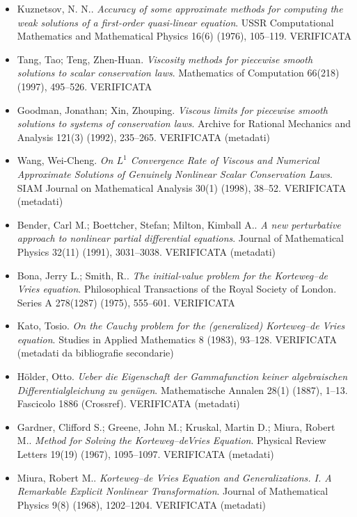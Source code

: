 \begin{itemize}[itemsep=2pt,leftmargin=1.2em,font=\small]
\item Kuznetsov, N. N.. \emph{Accuracy of some approximate methods for computing the weak solutions of a first-order quasi-linear equation}. USSR Computational Mathematics and Mathematical Physics 16(6) (1976), 105--119. \textsf{\footnotesize VERIFICATA}
\item Tang, Tao; Teng, Zhen-Huan. \emph{Viscosity methods for piecewise smooth solutions to scalar conservation laws}. Mathematics of Computation 66(218) (1997), 495--526. \textsf{\footnotesize VERIFICATA}
\item Goodman, Jonathan; Xin, Zhouping. \emph{Viscous limits for piecewise smooth solutions to systems of conservation laws}. Archive for Rational Mechanics and Analysis 121(3) (1992), 235--265. \textsf{\footnotesize VERIFICATA (metadati)}
\item Wang, Wei-Cheng. \emph{On {$L^1$} Convergence Rate of Viscous and Numerical Approximate Solutions of Genuinely Nonlinear Scalar Conservation Laws}. SIAM Journal on Mathematical Analysis 30(1) (1998), 38--52. \textsf{\footnotesize VERIFICATA (metadati)}
\item Bender, Carl M.; Boettcher, Stefan; Milton, Kimball A.. \emph{A new perturbative approach to nonlinear partial differential equations}. Journal of Mathematical Physics 32(11) (1991), 3031--3038. \textsf{\footnotesize VERIFICATA (metadati)}
\item Bona, Jerry L.; Smith, R.. \emph{The initial-value problem for the {K}orteweg--de {V}ries equation}. Philosophical Transactions of the Royal Society of London. Series A 278(1287) (1975), 555--601. \textsf{\footnotesize VERIFICATA}
\item Kato, Tosio. \emph{On the {C}auchy problem for the (generalized) {K}orteweg--de {V}ries equation}. Studies in Applied Mathematics 8 (1983), 93--128. \textsf{\footnotesize VERIFICATA (metadati da bibliografie secondarie)}
\item H{\"o}lder, Otto. \emph{Ueber die Eigenschaft der Gammafunction keiner algebraischen Differentialgleichung zu gen{\"u}gen}. Mathematische Annalen 28(1) (1887), 1--13. \textsf{\footnotesize Fascicolo 1886 (Crossref). VERIFICATA (metadati)}
\item Gardner, Clifford S.; Greene, John M.; Kruskal, Martin D.; Miura, Robert M.. \emph{Method for Solving the {K}orteweg--de{V}ries Equation}. Physical Review Letters 19(19) (1967), 1095--1097. \textsf{\footnotesize VERIFICATA (metadati)}
\item Miura, Robert M.. \emph{{K}orteweg--de {V}ries Equation and Generalizations. {I}. {A} Remarkable Explicit Nonlinear Transformation}. Journal of Mathematical Physics 9(8) (1968), 1202--1204. \textsf{\footnotesize VERIFICATA (metadati)}

\end{itemize}
